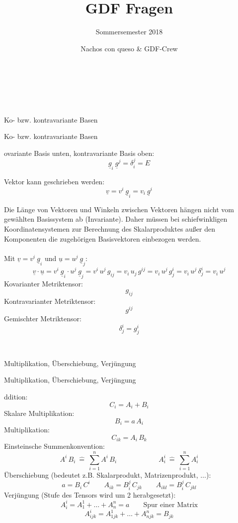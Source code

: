 \documentclass[DIV=1]{scrartcl}
\title{GDF Fragen}
\subtitle{Sommersemester 2018}
\author{Nachos con queso \& GDF-Crew}
\date{}
\newcommand{\frage}[3][10]{
    \newpage
    \ 
    \vspace{#1 em}
    \begin{framed}
        #2
    \end{framed}
    \newpage
    \begin{framed}
        #2
    \end{framed}
    \vspace{2 em}
}
\begin{document}
\maketitle \newpage
\ \newpage








\frage{Ko- bzw. kontravariante Basen}

Kovariante Basis unten, kontravariante Basis oben:
\[ \underline{g}_{i}\ \underline{g}^{j} = \delta_i^j = E \]

Vektor kann geschrieben werden:
\[ 
 \underline{v} = v^i \ \underline{g}_i = v_i \ \underline{g}^i 
\]

Die Länge von Vektoren und Winkeln zwischen Vektoren hängen nicht vom gewählten Basissystem ab (Invariante). Daher müssen bei schiefwinkligen Koordinatensystemen zur Berechnung des Skalarproduktes außer den Komponenten die zugehörigen Basisvektoren einbezogen werden.\\
\ \\
Mit $\underline{v} = v^i \ \underline{g}_i$ und $\underline{u} = u^j\ \underline{g}_j$:
\[
    \underline{v} \cdot \underline{u} = v^i \ \underline{g}_i \cdot u^j\ \underline{g}_j
    = v^i\, u^j\, g_{ij}
    = v_i\, u_j\, g^{ij}
    = v_i\, u^j\, g^i_j
    = v_i\, u^j\, \delta^i_j
    = v_i\, u^j
\]
Kovarianter Metriktensor: \[g_{ij}\]
Kontravarianter Metriktensor: \[g^{ij}\]
Gemischter Metriktensor: \[\delta^i_j = g^i_j\]



\frage{Multiplikation, Überschiebung, Verjüngung}

Addition:
\[
    C_i = A_i + B_i
\]
Skalare Multiplikation:
\[
    B_i = a\, A_i
\]
Multiplikation:
\[
    C_{ik} = A_i\, B_k
\]
Einsteinsche Summenkonvention:
\[
    A^i\, B_i\ \hat{=}\ \sum_{i=1}^n A^i\, B_i
    \qquad\qquad\qquad
    A^i_i\ \hat{=}\ \sum_{i=1}^n A^i_i
\]
Überschiebung (bedeutet z.B. Skalarprodukt, Matrizenprodukt, $\dots$):
\[
    a = B_i\, C^i
    \qquad
    A_{ik} = B_i^j\, C_{jk}
    \qquad
    A_{ikl} = B_i^j\, C_{jkl}
\]
Verjüngung (Stufe des Tensors wird um 2 herabgesetzt):
\[
    A^i_i = A^1_1 + \dots + A^n_n = a \qquad \text{Spur einer Matrix}
\]
\[
    A^i_{ijk} = A^1_{1jk} + \dots + A^n_{njk} = B_{jk}
\]
\end{document}
